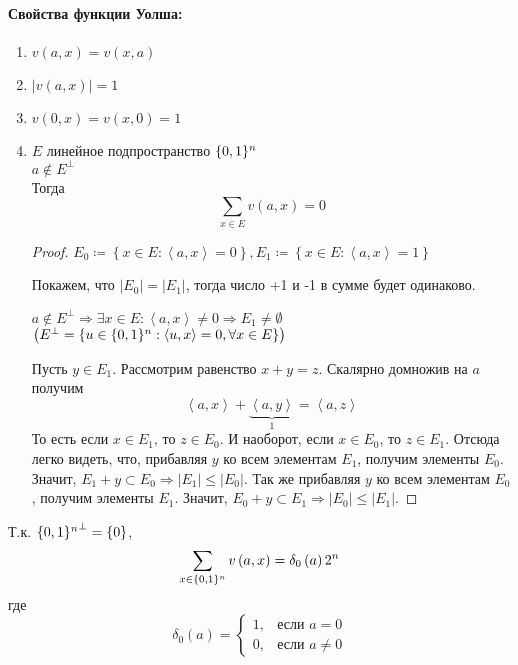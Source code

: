 \paragraph*{Свойства функции Уолша:}
\begin{enumerate}
\item $v\left(a,x\right)=v\left(x,a\right)$
\item $\left|v\left(a,x\right)\right|=1$
\item $v\left(0,x\right)=v\left(x,0\right)=1$
\item $E$ линейное подпространство $\{0,1\}^n$\\
$a\not\in E^{\perp}$\\
Тогда 
\[
\sum_{x\in E}v\left(a,x\right)=0
\]


\begin{proof}
$E_{0}\coloneqq\left\{ x\in E:\left\langle a,x\right\rangle =0\right\} ,E_{1}\coloneqq\left\{ x\in E:\left\langle a,x\right\rangle =1\right\} $

Покажем, что $\left|E_{0}\right|=\left|E_{1}\right|$, тогда число
+1 и -1 в сумме будет одинаково.

$a\not\in E^{\perp}\Rightarrow\exists x\in E:\left\langle a,x\right\rangle \not=0\Rightarrow E_{1}\not=\emptyset$
\textcolor{blue}{$\left(E^{\perp}=\left\{ u\in \{0,1\}^n:\left\langle u,x\right\rangle =0,\forall x\in E\right\} \right)$}

Пусть $y\in E_{1}$. Рассмотрим равенство $x+y=z$. Скалярно домножив
на $a$ получим
\[
\left\langle a,x\right\rangle +\underbrace{\left\langle a,y\right\rangle }_{1}=\left\langle a,z\right\rangle 
\]
То есть если $x\in E_{1}$, то $z\in E_{0}$. И наоборот, если $x\in E_{0}$,
то $z\in E_{1}.$ Отсюда легко видеть, что, прибавляя $y$ ко всем
элементам $E_{1}$, получим элементы $E_{0}$. Значит, $E_{1}+y\subset E_{0}\Rightarrow\left|E_{1}\right|\leq\left|E_{0}\right|$.
Так же прибавляя $y$ ко всем элементам $E_{0}$, получим элементы
$E_{1}$. Значит, $E_{0}+y\subset E_{1}\Rightarrow\left|E_{0}\right|\leq\left|E_{1}\right|$.
\end{proof}
\end{enumerate}
\begin{corollary}
Т.к. ${\{0,1\}^n}^{\perp}=\left\{ 0\right\} $, 
\[
\sum_{x\in \{0,1\}^n}v\left(a,x\right)=\delta_{0}\left(a\right)2^{n}
\]
где 
\[
\delta_{0}\left(a\right)=\begin{cases}
1, & \text{если }a=0\\
0, & \text{если }a\not=0
\end{cases}
\]
\end{corollary}


